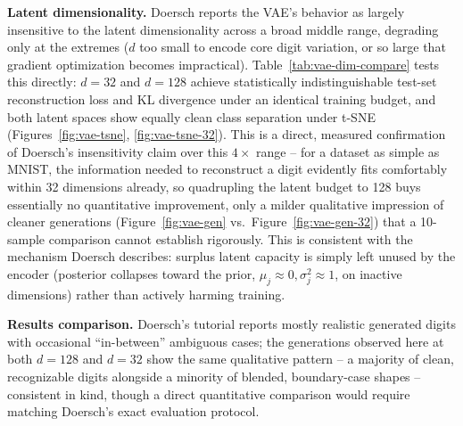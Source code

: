 \textbf{Latent dimensionality.} Doersch reports the VAE's behavior as
largely insensitive to the latent dimensionality across a broad middle
range, degrading only at the extremes ($d$ too small to encode core digit
variation, or so large that gradient optimization becomes impractical).
Table~\ref{tab:vae-dim-compare} tests this directly: $d=32$ and $d=128$
achieve statistically indistinguishable test-set reconstruction loss and
KL divergence under an identical training budget, and both latent spaces
show equally clean class separation under t-SNE
(Figures~\ref{fig:vae-tsne}, \ref{fig:vae-tsne-32}). This is a direct,
measured confirmation of Doersch's insensitivity claim over this
$4\times$ range -- for a dataset as simple as MNIST, the information
needed to reconstruct a digit evidently fits comfortably within 32
dimensions already, so quadrupling the latent budget to 128 buys
essentially no quantitative improvement, only a milder qualitative
impression of cleaner generations (Figure~\ref{fig:vae-gen} vs.\
Figure~\ref{fig:vae-gen-32}) that a 10-sample comparison cannot establish
rigorously. This is consistent with the mechanism Doersch describes:
surplus latent capacity is simply left unused by the encoder (posterior
collapses toward the prior, $\mu_j\approx0,\sigma_j^2\approx1$, on inactive
dimensions) rather than actively harming training.

\textbf{Results comparison.} Doersch's tutorial reports mostly realistic
generated digits with occasional ``in-between'' ambiguous cases; the
generations observed here at both $d=128$ and $d=32$ show the same
qualitative pattern -- a majority of clean, recognizable digits alongside
a minority of blended, boundary-case shapes -- consistent in kind, though
a direct quantitative comparison would require matching Doersch's exact
evaluation protocol.
